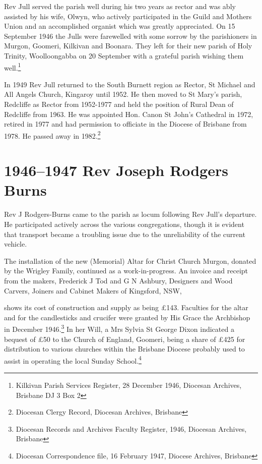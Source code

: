 Rev Jull served the parish well during his two years as rector and was ably assisted by his wife, Olwyn, who actively participated in the Guild and Mothers Union and an accomplished organist which was greatly appreciated. On 15 September 1946 the Julls were farewelled with some sorrow by the parishioners in Murgon, Goomeri, Kilkivan and Boonara. They left for their new parish of Holy Trinity, Woolloongabba on 20 September with a grateful parish wishing them well.\footnote{Kilkivan Parish Services Register, 28 December 1946, Diocesan Archives, Brisbane DJ 3 Box 2}


In 1949 Rev Jull returned to the South Burnett region as Rector, St Michael and All Angels Church, Kingaroy until 1952. He then moved to St Mary's parish, Redcliffe as Rector from 1952-1977 and held the position of Rural Dean of Redcliffe from 1963. He was appointed Hon. Canon St John's Cathedral in 1972, retired in 1977 and had permission to officiate in the Diocese of Brisbane from 1978. He passed away in 1982.\footnote{Diocesan Clergy Record, Diocesan Archives, Brisbane}


\section{1946--1947 Rev Joseph Rodgers Burns}



Rev J Rodgers-Burns came to the parish as locum following Rev Jull's departure. He participated actively across the various congregations, though it is evident that transport became a troubling issue due to the unreliability of the current vehicle.



The installation of the new (Memorial) Altar for Christ Church Murgon, donated by the Wrigley Family, continued as a work-in-progress. An invoice and receipt from the makers, Frederick J Tod and G N Ashbury, Designers and Wood Carvers, Joiners and Cabinet Makers of Kingsford, NSW,



shows its cost of construction and supply as being \pounds143. Faculties for the altar and for the candlesticks and crucifer were granted by His Grace the Archbishop in December 1946.\footnote{Diocesan Records and Archives Faculty Register, 1946, Diocesan Archives, Brisbane} In her Will, a Mrs Sylvia St George Dixon indicated a bequest of \pounds50 to the Church of England, Goomeri, being a share of \pounds425 for distribution to various churches within the Brisbane Diocese probably used to assist in operating the local Sunday School.\footnote{Diocesan Correspondence file, 16 February 1947, Diocese Archives, Brisbane}








